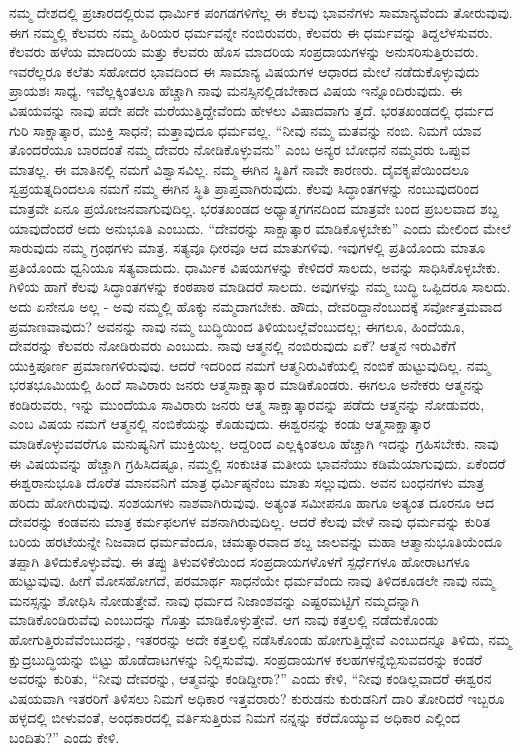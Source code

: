 ನಮ್ಮ ದೇಶದಲ್ಲಿ ಪ್ರಚಾರದಲ್ಲಿರುವ ಧಾರ್ಮಿಕ ಪಂಗಡಗಳಿಗೆಲ್ಲ ಈ ಕೆಲವು ಭಾವನೆಗಳು ಸಾಮಾನ್ಯವೆಂದು ತೋರುವುವು. ಈಗ ನಮ್ಮಲ್ಲಿ ಕೆಲವರು ನಮ್ಮ ಹಿರಿಯರ ಧರ್ಮವನ್ನೇ ನಂಬಿರುವರು, ಕೆಲವರು ಈ ಧರ್ಮವನ್ನು ತಿದ್ದಲೆಳಸುವರು. ಕೆಲವರು ಹಳೆಯ ಮಾದರಿಯ ಮತ್ತು ಕೆಲವರು ಹೊಸ ಮಾದರಿಯ ಸಂಪ್ರದಾಯಗಳನ್ನು ಅನುಸರಿಸುತ್ತಿರುವರು. ಇವರೆಲ್ಲರೂ ಕಲೆತು ಸಹೋದರ ಭಾವದಿಂದ ಈ ಸಾಮಾನ್ಯ ವಿಷಯಗಳ ಆಧಾರದ ಮೇಲೆ ನಡೆದುಕೊಳ್ಳುವುದು ಪ್ರಾಯಶಃ ಸಾಧ್ಯ. ಇವೆಲ್ಲಕ್ಕಿಂತಲೂ ಹೆಚ್ಚಾಗಿ ನಾವು ಮನಸ್ಸಿನಲ್ಲಿಡಬೇಕಾದ ವಿಷಯ ಇನ್ನೊಂದಿರುವುದು. ಈ ವಿಷಯವನ್ನು ನಾವು ಪದೇ ಪದೇ ಮರೆಯುತ್ತಿದ್ದೇವೆಂದು ಹೇಳಲು ವಿಷಾದವಾಗು ತ್ತದೆ. ಭರತಖಂಡದಲ್ಲಿ ಧರ್ಮದ ಗುರಿ ಸಾಕ್ಷಾತ್ಕಾರ, ಮುಕ್ತಿ ಸಾಧನೆ; ಮತ್ತಾವುದೂ ಧರ್ಮವಲ್ಲ. “ನೀವು ನಮ್ಮ ಮತವನ್ನು ನಂಬಿ. ನಿಮಗೆ ಯಾವ ತೊಂದರೆಯೂ ಬಾರದಂತೆ ನಮ್ಮ ದೇವರು ನೋಡಿಕೊಳ್ಳುವನು” ಎಂಬ ಅನ್ಯರ ಬೋಧನೆ ನಮ್ಮವರು ಒಪ್ಪುವ ಮಾತಲ್ಲ. ಈ ಮಾತಿನಲ್ಲಿ ನಮಗೆ ವಿಶ್ವಾಸವಿಲ್ಲ. ನಮ್ಮ ಈಗಿನ ಸ್ಥಿತಿಗೆ ನಾವೇ ಕಾರಣರು. ದೈವಕೃಪೆಯಿಂದಲೂ ಸ್ವಪ್ರಯತ್ನದಿಂದಲೂ ನಮಗೆ ನಮ್ಮ ಈಗಿನ ಸ್ಥಿತಿ ಪ್ರಾಪ್ತವಾಗಿರುವುದು. ಕೆಲವು ಸಿದ್ಧಾಂತಗಳನ್ನು ನಂಬುವುದರಿಂದ ಮಾತ್ರವೇ ಏನೂ ಪ್ರಯೋಜನವಾಗುವುದಿಲ್ಲ. ಭರತಖಂಡದ ಅಧ್ಯಾತ್ಮಗಗನದಿಂದ ಮಾತ್ರವೇ ಬಂದ ಪ್ರಬಲವಾದ ಶಬ್ದ ಯಾವುದೆಂದರೆ ಅದು ಅನುಭೂತಿ ಎಂಬುದು. “ದೇವರನ್ನು ಸಾಕ್ಷಾತ್ಕಾರ ಮಾಡಿಕೊಳ್ಳಬೇಕು” ಎಂದು ಮೇಲಿಂದ ಮೇಲೆ ಸಾರುವುದು ನಮ್ಮ ಗ್ರಂಥಗಳು ಮಾತ್ರ. ಸತ್ಯವೂ ಧೀರವೂ ಆದ ಮಾತುಗಳಿವು. ಇವುಗಳಲ್ಲಿ ಪ್ರತಿಯೊಂದು ಮಾತೂ ಪ್ರತಿಯೊಂದು ಧ್ವನಿಯೂ ಸತ್ಯವಾದುದು. ಧಾರ್ಮಿಕ ವಿಷಯಗಳನ್ನು ಕೇಳಿದರೆ ಸಾಲದು, ಅವನ್ನು ಸಾಧಿಸಿಕೊಳ್ಳಬೇಕು. ಗಿಳಿಯ ಹಾಗೆ ಕೆಲವು ಸಿದ್ಧಾಂತಗಳನ್ನು ಕಂಠಪಾಠ ಮಾಡಿದರೆ ಸಾಲದು. ಅವುಗಳನ್ನು ನಮ್ಮ ಬುದ್ಧಿ ಒಪ್ಪಿದರೂ ಸಾಲದು. ಅದು ಏನೇನೂ ಅಲ್ಲ - ಅವು ನಮ್ಮಲ್ಲಿ ಹೊಕ್ಕು ನಮ್ಮದಾಗಬೇಕು. ಹೌದು, ದೇವರಿದ್ದಾನೆಂಬುದಕ್ಕೆ ಸರ್ವೋತ್ತಮವಾದ ಪ್ರಮಾಣವಾವುದು? ಅವನನ್ನು ನಾವು ನಮ್ಮ ಬುದ್ಧಿಯಿಂದ ತಿಳಿಯಬಲ್ಲೆವೆಂಬುದಲ್ಲ; ಈಗಲೂ, ಹಿಂದೆಯೂ, ದೇವರನ್ನು ಕೆಲವರು ನೋಡಿರುವರು ಎಂಬುದು. ನಾವು ಆತ್ಮನಲ್ಲಿ ನಂಬಿರುವುದು ಏಕೆ? ಆತ್ಮನ ಇರುವಿಕೆಗೆ ಯುಕ್ತಿಪೂರ್ಣ ಪ್ರಮಾಣಗಳಿರುವುವು. ಆದರೆ ಇದರಿಂದ ನಮಗೆ ಆತ್ಮನಿರುವಿಕೆಯಲ್ಲಿ ನಂಬಿಕೆ ಹುಟ್ಟುವುದಿಲ್ಲ. ನಮ್ಮ ಭರತಭೂಮಿಯಲ್ಲಿ ಹಿಂದೆ ಸಾವಿರಾರು ಜನರು ಆತ್ಮಸಾಕ್ಷಾತ್ಕಾರ ಮಾಡಿಕೊಂಡರು. ಈಗಲೂ ಅನೇಕರು ಆತ್ಮನನ್ನು ಕಂಡಿರುವರು, ಇನ್ನು ಮುಂದೆಯೂ ಸಾವಿರಾರು ಜನರು ಆತ್ಮ ಸಾಕ್ಷಾತ್ಕಾರವನ್ನು ಪಡೆದು ಆತ್ಮನನ್ನು ನೋಡುವರು, ಎಂಬ ವಿಷಯ ನಮಗೆ ಆತ್ಮನಲ್ಲಿ ನಂಬಿಕೆಯನ್ನು ಕೊಡುವುದು. ಈಶ್ವರನನ್ನು ಕಂಡು ಆತ್ಮಸಾಕ್ಷಾತ್ಕಾರ ಮಾಡಿಕೊಳ್ಳುವವರೆಗೂ ಮನುಷ್ಯನಿಗೆ ಮುಕ್ತಿಯಿಲ್ಲ. ಆದ್ದರಿಂದ ಎಲ್ಲಕ್ಕಿಂತಲೂ ಹೆಚ್ಚಾಗಿ ಇದನ್ನು ಗ್ರಹಿಸಬೇಕು. ನಾವು ಈ ವಿಷಯವನ್ನು ಹೆಚ್ಚಾಗಿ ಗ್ರಹಿಸಿದಷ್ಟೂ, ನಮ್ಮಲ್ಲಿ ಸಂಕುಚಿತ ಮತೀಯ ಭಾವನೆಯು ಕಡಿಮೆಯಾಗುವುದು. ಏಕೆಂದರೆ ಈಶ್ವರಾನುಭೂತಿ ದೊರೆತ ಮಾನವನಿಗೆ ಮಾತ್ರ ಧರ್ಮಿಷ್ಠನೆಂಬ ಮಾತು ಸಲ್ಲುವುದು. ಅವನ ಬಂಧನಗಳು ಮಾತ್ರ ಹರಿದು ಹೋಗಿರುವುವು. ಸಂಶಯಗಳು ನಾಶವಾಗಿರುವುವು. ಅತ್ಯಂತ ಸಮೀಪನೂ ಹಾಗೂ ಅತ್ಯಂತ ದೂರನೂ ಆದ ದೇವರನ್ನು ಕಂಡವನು ಮಾತ್ರ ಕರ್ಮಫಲಗಳ ವಶನಾಗಿರುವುದಿಲ್ಲ. ಆದರೆ ಕೆಲವು ವೇಳೆ ನಾವು ಧರ್ಮವನ್ನು ಕುರಿತ ಬರಿಯ ಹರಟೆಯನ್ನೇ ನಿಜವಾದ ಧರ್ಮವೆಂದೂ, ಚಮತ್ಕಾರವಾದ ಶಬ್ದ ಜಾಲವನ್ನು ಮಹಾ ಆತ್ಮಾನುಭೂತಿಯೆಂದೂ ತಪ್ಪಾಗಿ ತಿಳಿದುಕೊಳ್ಳುವೆವು. ಈ ತಪ್ಪು ತಿಳುವಳಿಕೆಯಿಂದ ಸಂಪ್ರದಾಯಗಳೊಳಗೆ ಸ್ಪರ್ಧೆಗಳೂ ಹೋರಾಟಗಳೂ ಹುಟ್ಟುವುವು. ಹೀಗೆ ಮೋಸಹೋಗದೆ, ಪರಮಾರ್ಥ ಸಾಧನೆಯೇ ಧರ್ಮವೆಂದು ನಾವು ತಿಳಿದಕೂಡಲೇ ನಾವು ನಮ್ಮ ಮನಸ್ಸನ್ನು ಶೋಧಿಸಿ ನೋಡುತ್ತೇವೆ. ನಾವು ಧರ್ಮದ ನಿಜಾಂಶವನ್ನು ಎಷ್ಟರಮಟ್ಟಿಗೆ ನಮ್ಮದನ್ನಾಗಿ ಮಾಡಿಕೊಂಡಿರುವೆವು ಎಂಬುದನ್ನು ಗೊತ್ತು ಮಾಡಿಕೊಳ್ಳುತ್ತೇವೆ. ಆಗ ನಾವು ಕತ್ತಲಲ್ಲಿ ನಡೆದುಕೊಂಡು ಹೋಗುತ್ತಿರುವೆವೆಂಬುದನ್ನು, ಇತರರನ್ನು ಅದೇ ಕತ್ತಲಲ್ಲಿ ನಡೆಸಿಕೊಂಡು ಹೋಗುತ್ತಿದ್ದೇವೆ ಎಂಬುದನ್ನೂ ತಿಳಿದು, ನಮ್ಮ ಕ್ಷುದ್ರಬುದ್ಧಿಯನ್ನು ಬಿಟ್ಟು ಹೊಡೆದಾಟಗಳನ್ನು ನಿಲ್ಲಿಸುವೆವು. ಸಂಪ್ರದಾಯಗಳ ಕಲಹಗಳನ್ನೆಬ್ಬಿಸುವವರನ್ನು ಕಂಡರೆ ಅವರನ್ನು ಕುರಿತು, “ನೀವು ದೇವರನ್ನು, ಆತ್ಮವನ್ನು ಕಂಡಿದ್ದೀರಾ?” ಎಂದು ಕೇಳಿ, “ನೀವು ಕಂಡಿಲ್ಲವಾದರೆ ಈಶ್ವರನ ವಿಷಯವಾಗಿ ಇತರರಿಗೆ ತಿಳಿಸಲು ನಿಮಗೆ ಅಧಿಕಾರ ಇತ್ತವರಾರು? ಕುರುಡನು ಕುರುಡನಿಗೆ ದಾರಿ ತೋರಿದರೆ ಇಬ್ಬರೂ ಹಳ್ಳದಲ್ಲಿ ಬೀಳುವಂತೆ, ಅಂಧಕಾರದಲ್ಲಿ ವರ್ತಿಸುತ್ತಿರುವ ನಿಮಗೆ ನನ್ನನ್ನು ಕರೆದೊಯ್ಯುವ ಅಧಿಕಾರ ಎಲ್ಲಿಂದ ಬಂದಿತು?” ಎಂದು ಕೇಳಿ.

